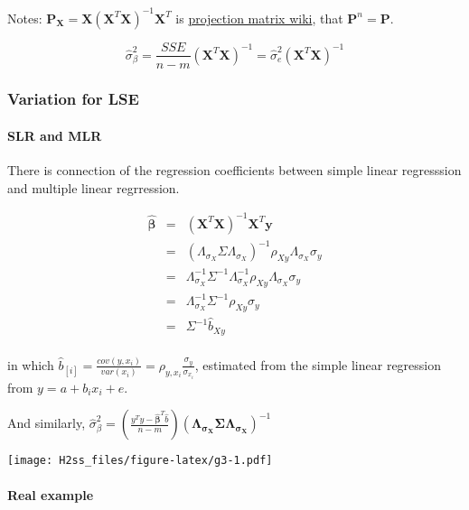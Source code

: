 \documentclass[]{article}
\let\oldparagraph\paragraph
\renewcommand{\paragraph}[1]{\oldparagraph{#1}\mbox{}}
\begin{document}
Notes:
\(\mathbf{P}_{\mathbf{X}}=\mathbf{X}(\mathbf{X}^T\mathbf{X})^{-1}\mathbf{X}^T\)
is
\href{https://en.wikipedia.org/wiki/Projection_(linear_algebra)}{projection
matrix wiki}, that \(\mathbf{P}^n=\mathbf{P}\).

\[\hat{\sigma}_{\beta}^2=\frac{SSE}{n-m}(\mathbf{X}^T\mathbf{X})^{-1}=\hat{\sigma}^2_e(\mathbf{X}^T\mathbf{X})^{-1}\]

\hypertarget{variation-for-lse}{%
\subsubsection{Variation for LSE}\label{variation-for-lse}}

\hypertarget{slr-and-mlr}{%
\paragraph{SLR and MLR}\label{slr-and-mlr}}

There is connection of the regression coefficients between simple linear
regresssion and multiple linear regrression.

\[\begin{align}
\hat{\mathbf{\beta}}&=&(\mathbf{X}^T\mathbf{X})^{-1}\mathbf{X}^T\mathbf{y}\\
&=&(\Lambda_{\sigma_X}\Sigma\Lambda_{\sigma_X})^{-1}\rho_{Xy}\Lambda_{\sigma_X}\sigma_y\\
&=&\Lambda_{\sigma_X}^{-1}\Sigma^{-1}\Lambda_{\sigma_X}^{-1}\rho_{Xy}\Lambda_{\sigma_X}\sigma_y\\
&=&\Lambda_{\sigma_X}^{-1}\Sigma^{-1}\rho_{Xy}\sigma_y\\
&=&\Sigma^{-1}\hat{b}_{Xy}\\
\end{align}
\]

in which
\(\hat{b}_{[i]}=\frac{cov(y, x_i)}{var(x_i)}=\rho_{y,x_i}\frac{\sigma_y}{\sigma_{x_i}}\),
estimated from the simple linear regression from \(y=a+b_ix_i+e\).

And similarly,
\(\hat{\sigma}^2_{\beta}=(\frac{y^Ty-\hat{\mathbf{\beta}}^T\hat{b}}{n-m})(\mathbf{\Lambda_{\sigma_X}\Sigma\Lambda_{\sigma_X}})^{-1}\)

\texttt{[image: H2ss\_files/figure-latex/g3-1.pdf]}

\hypertarget{real-example}{%
\paragraph{Real example}\label{real-example}}
\end{document}
